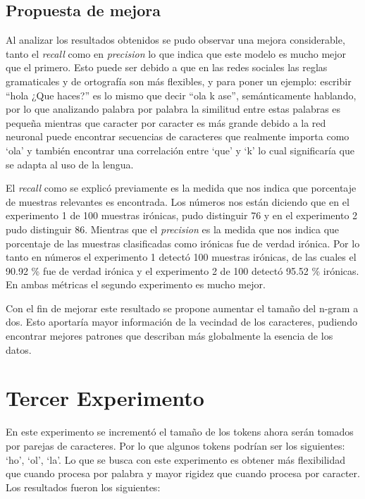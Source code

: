 \subsection{Propuesta de mejora} %

\par Al analizar los resultados obtenidos se pudo observar una mejora considerable, tanto el \textit{recall} como en \textit{precision} lo que indica que este modelo es mucho mejor que el primero. Esto puede ser debido a que en las redes sociales las reglas gramaticales y de ortografía son más flexibles, y para poner un ejemplo: escribir
``hola ¿Que haces?'' es lo mismo que decir ``ola k ase'', semánticamente hablando, por lo que analizando palabra por palabra la similitud entre estas palabras es pequeña mientras que caracter por caracter es más grande debido a la red neuronal puede encontrar secuencias de caracteres que realmente importa como `ola'  y también encontrar una correlación entre `que' y `k' lo cual significaría que se adapta al uso de la lengua.

\par El \textit{recall} como se explicó previamente es la medida que nos indica que porcentaje de muestras relevantes es encontrada. Los números nos están diciendo que en el experimento 1 de 100 muestras irónicas, pudo distinguir 76 y en el experimento 2 pudo distinguir 86. Mientras que el \textit{precision} es la medida que nos indica que porcentaje de las muestras clasificadas como irónicas fue de verdad irónica. Por lo tanto en números el experimento 1 detectó 100 muestras irónicas, de las cuales el 90.92 \% fue de verdad irónica y el experimento 2 de 100 detectó 95.52 \% irónicas. En ambas métricas el segundo experimento es mucho mejor.

\par Con el fin de mejorar este resultado se propone aumentar el tamaño del n-gram a dos. Esto aportaría mayor información de la vecindad de los caracteres, pudiendo encontrar mejores patrones que describan más globalmente la esencia de los datos.

\section{Tercer Experimento}
\par En este experimento se incrementó el tamaño de los tokens ahora serán tomados por parejas de caracteres. Por lo que algunos tokens podrían ser los siguientes: `ho', `ol', `la'. Lo que se busca con este experimento es obtener más flexibilidad que cuando procesa por palabra y mayor rigidez que cuando procesa por caracter. Los resultados fueron los siguientes:

